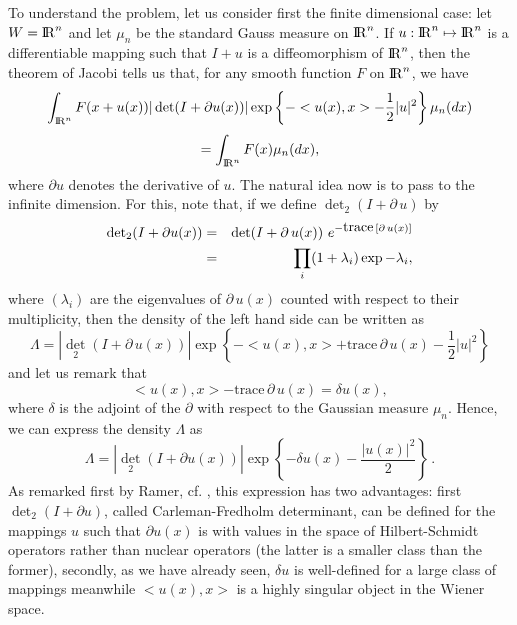\documentclass[12pt,a4paper]{book}
\def\t{\mbox{trace}}
\newcommand{\R}{{\rm I\!R}}
\newcommand{\dett}{{\textstyle{\det_2}}}
\begin{document}
To understand the problem, let us consider first the finite dimensional case:
let $W=\R^n$ and let $\mu_n$ be the standard Gauss measure on
$\R^n$. If $u:\R^n\mapsto \R^n$ is a differentiable mapping such that
$I+u$ is a diffeomorphism of $\R^n$, then the theorem of Jacobi tells
us that, for any smooth function $F$ on $\R^n$, we have 
$$
\int_{\R^n}F(x+u(x))|\det(I+\partial
u(x))|\exp\left\{-<u(x),x>-\frac{1}{2}|u|^2\right\}\mu_n(dx) 
$$
$$
 = \int_{\R^n}F(x)\mu_n(dx),
$$
where $\partial u$  denotes the derivative of $u$.
The natural idea now is to pass to the infinite dimension. For this,
note that, if we define $\dett(I+\partial\, u)$ by
\begin{eqnarray*}
\dett(I+\partial u(x))&=&{\mbox{\rm det}}(I+\partial\, u(x))
\,\,e^{-\t\, [\partial\, u(x)]}\\
  &=&\prod_i (1+\lambda_i)\exp-\lambda_i,
\end{eqnarray*}
where $(\lambda_i)$ are the eigenvalues of $\partial\,u(x)$ counted
with respect to their multiplicity,
then the density of the left hand side can be written as
\index[not]{c@$\dett(I+\nabla u)$}
$$
\Lambda=|\dett(I+\partial\, u(x))|\exp\left\{-<u(x),x>+\t \, \partial\,
u(x)-\frac{1}{2}|u|^2\right\}
$$
and let us remark that
$$
<u(x),x>-\t \, \partial\, u(x)=\delta u(x),
$$
where $\delta$ is the adjoint of the $\partial$ with respect to the
Gaussian measure $\mu_n$.
Hence, we can express the density $\Lambda$  as
$$
\Lambda=|\dett(I+\partial u(x))|\exp\left\{-\delta
  u(x)-\frac{|u(x)|^2}{2}\right\}\,. 
$$
 As remarked first by Ramer, cf. \cite{R}, this expression has two
advantages: first $\dett(I+\partial u)$, called Carleman-Fredholm determinant,
 can be defined for the
mappings $u$ such that $\partial u(x)$ is with values in the space of
Hilbert-Schmidt operators rather than nuclear operators (the latter is
a smaller class than the former), secondly, as we have already seen,
$\delta u$ is well-defined for a large class of mappings meanwhile
$<u(x),x>$ is a highly singular object in the Wiener space.
\end{document}
